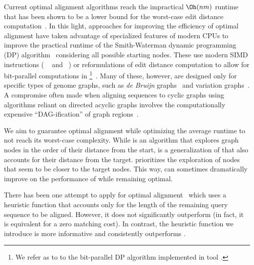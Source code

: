 Current optimal alignment algorithms reach the impractical $\Oh(nm)$ runtime
that has been shown to be a lower bound for the worst-case edit distance
computation~\cite{backurs2015edit}. In this light, approaches for improving the
efficiency of optimal alignment have taken advantage of specialized features of
modern CPUs to improve the practical runtime of the Smith-Waterman dynamic
programming (DP) algorithm~\cite{smith_comparison_1981} considering all possible
starting nodes. These use modern SIMD instructions (\eg
\vg~\cite{garrison_variation_2018} and \pasgal~\cite{jain_accelerating_2019}) or
reformulations of edit distance computation to allow for bit-parallel
computations in \graphaligner \footnote{We refer as \bitparallel to to the
bit-parallel DP algorithm implemented in \graphaligner tool
\cite{rautiainen_bitparallel_2019}.}~\cite{rautiainen_bitparallel_2019}. Many of
these, however, are designed only for specific types of genome graphs, such as
{\itshape de Bruijn}
graphs~\cite{liu_debga_2016,heydari_browniealigner_2018,limasset2019toward} and
variation graphs~\cite{garrison_variation_2018}. A compromise often made when
aligning sequences to cyclic graphs using algorithms reliant on directed acyclic
graphs involves the computationally expensive ``DAG-ification'' of graph
regions~\cite{kavya_sequence_2019,garrison_variation_2018}.

We aim to guarantee optimal alignment while optimizing the average runtime
to not reach its worst-case complexity. While \dijkstra is an algorithm that
explores graph nodes in the order of their distance from the start, \A is a
generalization of \dijkstra that also accounts for their distance from the
target. \A prioritizes the exploration of nodes that seem to be closer to the
target nodes. This way, \A can sometimes dramatically improve on the performance
of \dijkstra while remaining optimal.

There has been one attempt to apply \A for optimal
alignment~\cite{dox2018efficient} which uses a heuristic function that accounts
only for the length of the remaining query sequence to be aligned. However, it
does not significantly outperform \dijkstra (in fact, it is equivalent for
a zero matching cost).
%
In contrast, the heuristic function we introduce is more informative and
consistently outperforms \dijkstra.

